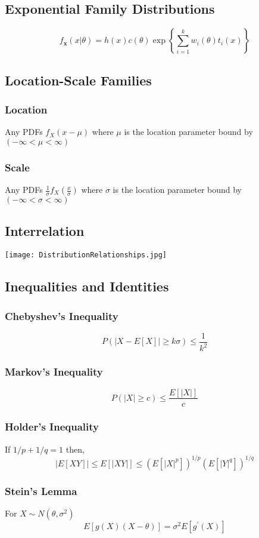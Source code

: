 	
\subsection*{Exponential Family Distributions}
\[ f_\mathbf{x}(x|\theta) = h(x)c(\theta) \exp \left\{ \sum_{i=1}^k w_i(\theta)t_i(x) \right\} \]

\subsection*{Location-Scale Families}
	\subsubsection*{Location}
		Any PDFs \(f_X(x-\mu)\) where \(\mu\) is the 
		location parameter bound by \((-\infty<\mu<\infty)\)
		
	\subsubsection*{Scale}
		Any PDFs \(\frac{1}{\sigma}f_X(\frac{x}{\sigma})\) where \(\sigma\) is the 
		location parameter bound by \((-\infty<\sigma<\infty)\)
		

\subsection*{Interrelation}
\texttt{[image: DistributionRelationships.jpg]}


\subsection*{Inequalities and Identities}
	\subsubsection*{Chebyshev's Inequality}
		\[P(|X-E[X]|\geq k\sigma) \leq \frac{1}{k^2}\]
	\subsubsection*{Markov's Inequality}
		\[P(|X|\geq c)\leq \frac{E[|X|]}{c}\]
	\subsubsection*{Holder's Inequality}
		If \(1/p+1/q=1\) then,
		\[ |E[XY]| \leq E[|XY|]\leq (E[|X|^p])^{1/p}(E[|Y|^q])^{1/q} \]
	\subsubsection*{Stein's Lemma}
		For \(X\sim N(\theta,\sigma^2)\)
		\[ E[g(X)(X-\theta)] = \sigma^2 E[g^\prime(X)] \]
		




